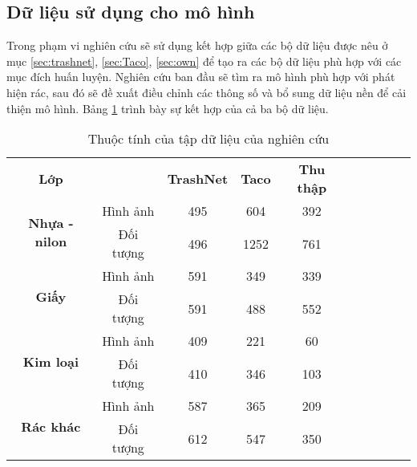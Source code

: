 \documentclass[../the.tex]{subfiles}
\begin{document}
\subsection{Dữ liệu sử dụng cho mô hình}
{\fontsize{13}{12} \selectfont 
Trong phạm vi nghiên cứu sẽ sử dụng kết hợp giữa các bộ dữ liệu được nêu ở mục \ref{sec:trashnet}, \ref{sec:Taco}, \ref{sec:own} để tạo ra các bộ dữ liệu phù hợp với các mục đích huấn luyện.
Nghiên cứu ban đầu sẽ tìm ra mô hình phù hợp với phát hiện rác, sau đó sẽ đề xuất điều chỉnh các thông số và bổ sung dữ liệu nền để cải thiện mô hình.
Bảng \ref{tab:datasetmain} trình bày sự kết hợp của cả ba bộ dữ liệu. 
}
\begin{table}[!ht]
	\centering
	\caption{Thuộc tính của tập dữ liệu của nghiên cứu}
	\begin{tabular}{|c|c|c|c|c|ccccc}
	\cline{1-5}
	\textbf{Lớp}                           &            & \textbf{TrashNet} & \textbf{Taco} & \textbf{Thu thập} &  &  &  &  &  \\ \cline{1-5}
	\multirow{2}{*}{\textbf{Nhựa - nilon}} & Hình ảnh   & 495               & 604           & 392               &  &  &  &  &  \\ \cline{2-5}
										   & Đối tượng  & 496               & 1252          & 761               &  &  &  &  &  \\ \cline{1-5}
	\multirow{2}{*}{\textbf{Giấy}}         & Hình ảnh   & 591               & 349           & 339               &  &  &  &  &  \\ \cline{2-5}
										   & Đối tượng  & 591               & 488           & 552               &  &  &  &  &  \\ \cline{1-5}
	\multirow{2}{*}{\textbf{Kim loại}}   & Hình ảnh   & 409               & 221           & 60                &  &  &  &  &  \\ \cline{2-5}
										   & Đối tượng  & 410               & 346           & 103               &  &  &  &  &  \\ \cline{1-5}
	\multirow{2}{*}{\textbf{Rác khác}}     & Hình   ảnh & 587               & 365           & 209               &  &  &  &  &  \\ \cline{2-5}
										   & Đối tượng  & 612               & 547           & 350               &  &  &  &  &  \\ \cline{1-5}
	\end{tabular}
	\label{tab:datasetmain}
\end{table}
\end{document}
